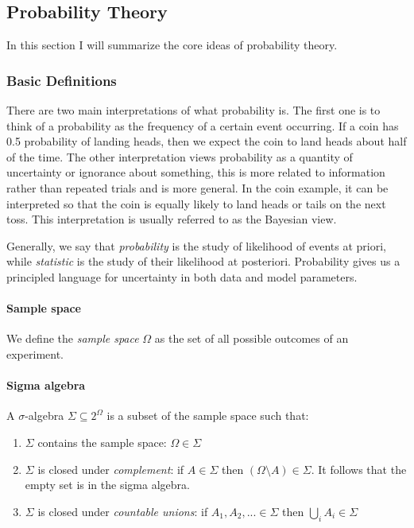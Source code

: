 \documentclass{article}
\begin{document}
\subsection{Probability Theory}\label{probability-theory}

In this section I will summarize the core ideas of probability theory.

\subsubsection{Basic Definitions}\label{basic-definitions}

There are two main interpretations of what probability is. The first one
is to think of a probability as the frequency of a certain event
occurring. If a coin has 0.5 probability of landing heads, then we
expect the coin to land heads about half of the time. The other
interpretation views probability as a quantity of uncertainty or
ignorance about something, this is more related to information rather
than repeated trials and is more general. In the coin example, it can be
interpreted so that the coin is equally likely to land heads or tails on
the next toss. This interpretation is usually referred to as the
Bayesian view.

Generally, we say that \emph{probability} is the study of likelihood of
events at priori, while \emph{statistic} is the study of their
likelihood at posteriori. Probability gives us a principled language for
uncertainty in both data and model parameters.

\paragraph{Sample space}\label{sample-space}

We define the \emph{sample space} \(\Omega\) as the set of all possible
outcomes of an experiment.

\paragraph{Sigma algebra}\label{sigma-algebra}

A \(\sigma\)-algebra \(\Sigma \subseteq 2^{\Omega}\) is a subset of the
sample space such that:

\begin{enumerate}
\def\labelenumi{\arabic{enumi}.}
\tightlist
\item
  \(\Sigma\) contains the sample space: \(\Omega \in \Sigma\)
\item
  \(\Sigma\) is closed under \emph{complement}: if \(A \in \Sigma\) then
  \((\Omega
  \setminus A) \in \Sigma\). It follows that the empty set is in the
  sigma algebra.
\item
  \(\Sigma\) is closed under \emph{countable unions}: if
  \(A_1, A_2, ... \in \Sigma\) then \(\bigcup_i A_i \in \Sigma\)
\end{enumerate}
\end{document}
